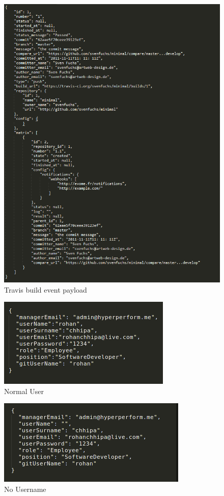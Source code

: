 \documentclass[11pt,a4paper]{article}
\begin{document}
\begin{figure}[H]
	\centering
	\includegraphics[width=\linewidth]{../Images/travisEvent}
	\caption{Travis build event payload}
\end{figure}

\begin{figure}[H]
	\centering
	\includegraphics[width=.5\linewidth]{../Images/normaluser}
	\caption{Normal User}
\end{figure}

\begin{figure}[H]
	\centering
	\includegraphics[width=.5\linewidth]{../Images/nousername}
	\caption{No Username}
\end{figure}
\end{document}
